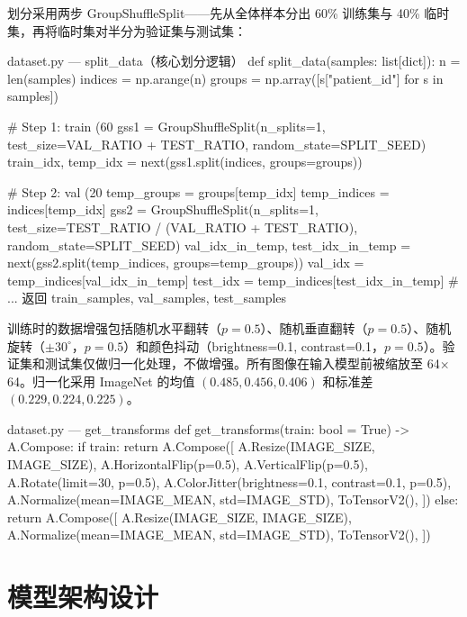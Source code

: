 \documentclass[12pt,a4paper]{ctexart}
\begin{document}
划分采用两步 GroupShuffleSplit——先从全体样本分出 60\% 训练集与 40\% 临时集，再将临时集对半分为验证集与测试集：

\begin{pythoncode}{dataset.py — split\_data（核心划分逻辑）}
def split_data(samples: list[dict]):
    n = len(samples)
    indices = np.arange(n)
    groups = np.array([s["patient_id"] for s in samples])

    # Step 1: train (60%
    gss1 = GroupShuffleSplit(n_splits=1, test_size=VAL_RATIO + TEST_RATIO,
                             random_state=SPLIT_SEED)
    train_idx, temp_idx = next(gss1.split(indices, groups=groups))

    # Step 2: val (20%
    temp_groups = groups[temp_idx]
    temp_indices = indices[temp_idx]
    gss2 = GroupShuffleSplit(n_splits=1,
                             test_size=TEST_RATIO / (VAL_RATIO + TEST_RATIO),
                             random_state=SPLIT_SEED)
    val_idx_in_temp, test_idx_in_temp = next(gss2.split(temp_indices,
                                                         groups=temp_groups))
    val_idx  = temp_indices[val_idx_in_temp]
    test_idx = temp_indices[test_idx_in_temp]
    # ... 返回 train_samples, val_samples, test_samples
\end{pythoncode}

训练时的数据增强包括随机水平翻转（$p=0.5$）、随机垂直翻转（$p=0.5$）、随机旋转（$\pm 30^\circ$，$p=0.5$）和颜色抖动（brightness=0.1, contrast=0.1，$p=0.5$）。验证集和测试集仅做归一化处理，不做增强。所有图像在输入模型前被缩放至 64$\times$64。归一化采用 ImageNet 的均值 $(0.485, 0.456, 0.406)$ 和标准差 $(0.229, 0.224, 0.225)$。

\begin{pythoncode}{dataset.py — get\_transforms}
def get_transforms(train: bool = True) -> A.Compose:
    if train:
        return A.Compose([
            A.Resize(IMAGE_SIZE, IMAGE_SIZE),
            A.HorizontalFlip(p=0.5),
            A.VerticalFlip(p=0.5),
            A.Rotate(limit=30, p=0.5),
            A.ColorJitter(brightness=0.1, contrast=0.1, p=0.5),
            A.Normalize(mean=IMAGE_MEAN, std=IMAGE_STD),
            ToTensorV2(),
        ])
    else:
        return A.Compose([
            A.Resize(IMAGE_SIZE, IMAGE_SIZE),
            A.Normalize(mean=IMAGE_MEAN, std=IMAGE_STD),
            ToTensorV2(),
        ])
\end{pythoncode}

\section{模型架构设计}
\end{document}

